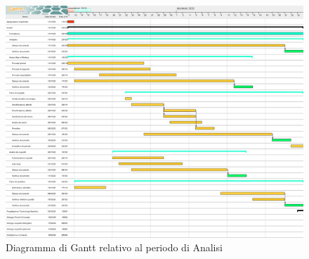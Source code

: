 \documentclass{article}
\begin{document}
\begin{figure}[H]
    \centering
    \includegraphics[width=\textwidth,height=\textheight,keepaspectratio]{documenti/grafici/diagramma-gantt-periodo-analisi.png}
    \caption{Diagramma di Gantt relativo al periodo di Analisi}
    \label{fig:GA}
\end{figure}
\end{document}
